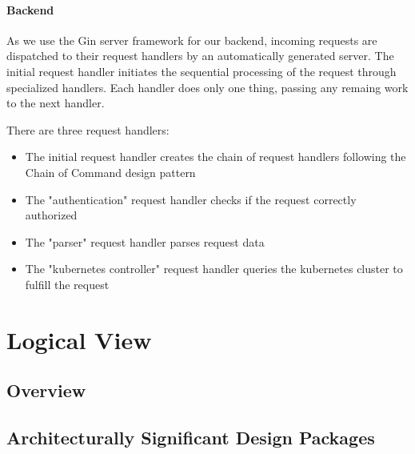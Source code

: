 \documentclass[a4paper,12pt,chapterprefix=false,bibliography=totoc,listof=totoc,]{scrreprt}
\begin{document}
\subsubsection{Backend}
As we use the Gin server framework for our backend, incoming requests are dispatched to their request handlers by an automatically generated server. The initial request handler initiates the sequential processing of the request through specialized handlers. Each handler does only one thing, passing any remaing work to the next handler.

There are three request handlers:
\begin{itemize}
	\item The initial request handler creates the chain of request handlers following the Chain of Command design pattern
	\item The "authentication" request handler checks if the request correctly authorized
	\item The "parser" request handler parses request data
	\item The "kubernetes controller" request handler queries the kubernetes cluster to fulfill the request 
\end{itemize}

\chapter{Logical View}

\section{Overview}

\section{Architecturally Significant Design Packages}
\end{document}
